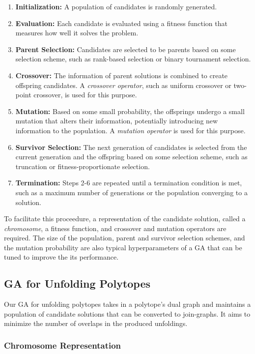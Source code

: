 \documentclass[conference]{IEEEtran}
\begin{document}
\begin{enumerate}[label=(\arabic*)]
    \item \textbf{Initialization:} A population of candidates is randomly generated.
    \item \textbf{Evaluation:} Each candidate is evaluated using a fitness function that measures how well it solves the problem.
    \item \textbf{Parent Selection:} Candidates are selected to be parents based on some selection scheme, such as rank-based selection or binary tournament selection.
    \item \textbf{Crossover:} The information of parent solutions is combined to create offspring candidates. A \emph{crossover operator}, such as uniform crossover or two-point crossover, is used for this purpose.
    \item \textbf{Mutation:} Based on some small probability, the offsprings undergo a small mutation that alters their information, potentially introducing new information to the population. A \emph{mutation operator} is used for this purpose.
    \item \textbf{Survivor Selection:} The next generation of candidates is selected from the current generation and the offspring based on some selection scheme, such as truncation or fitness-proportionate selection.
    \item \textbf{Termination:} Steps 2-6 are repeated until a termination condition is met, such as a maximum number of generations or the population converging to a solution.
\end{enumerate}

To facilitate this proceedure, a representation of the candidate solution, called a \emph{chromosome}, a fitness function, and crossover and mutation operators are required. The size of the population, parent and survivor selection schemes, and the mutation probability are also typical hyperparameters of a GA that can be tuned to improve the its performance.

\subsection{GA for Unfolding Polytopes}

Our GA for unfolding polytopes takes in a polytope's dual graph and maintains a population of candidate solutions that can be converted to join-graphs. It aims to minimize the number of overlaps in the produced unfoldings.

\subsubsection{Chromosome Representation}
\end{document}
